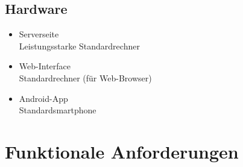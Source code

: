 \documentclass[a4paper]{scrreprt}
\begin{document}
        \section{Hardware}
            \begin{itemize}
                \item Serverseite\\
                    Leistungsstarke Standardrechner
                \item  Web-Interface\\
                    Standardrechner (für Web-Browser)
                \item Android-App\\
                    Standardsmartphone
            \end{itemize}

    \chapter{Funktionale Anforderungen}
\end{document}
